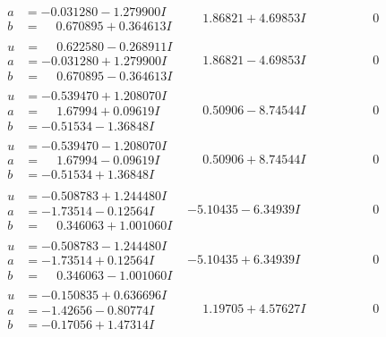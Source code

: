 \documentclass[1p]{elsarticle_modified}
\theoremstyle{definition}
\begin{document}
$$\begin{array}{c|c|c}
\begin{aligned}
a &= -0.031280 - 1.279900 I \\
b &= \phantom{-}0.670895 + 0.364613 I\end{aligned}
 & \phantom{-}1.86821 + 4.69853 I & \phantom{-0.000000 } 0 \\ \hline\begin{aligned}
u &= \phantom{-}0.622580 - 0.268911 I \\
a &= -0.031280 + 1.279900 I \\
b &= \phantom{-}0.670895 - 0.364613 I\end{aligned}
 & \phantom{-}1.86821 - 4.69853 I & \phantom{-0.000000 } 0 \\ \hline\begin{aligned}
u &= -0.539470 + 1.208070 I \\
a &= \phantom{-}1.67994 + 0.09619 I \\
b &= -0.51534 - 1.36848 I\end{aligned}
 & \phantom{-}0.50906 - 8.74544 I & \phantom{-0.000000 } 0 \\ \hline\begin{aligned}
u &= -0.539470 - 1.208070 I \\
a &= \phantom{-}1.67994 - 0.09619 I \\
b &= -0.51534 + 1.36848 I\end{aligned}
 & \phantom{-}0.50906 + 8.74544 I & \phantom{-0.000000 } 0 \\ \hline\begin{aligned}
u &= -0.508783 + 1.244480 I \\
a &= -1.73514 - 0.12564 I \\
b &= \phantom{-}0.346063 + 1.001060 I\end{aligned}
 & -5.10435 - 6.34939 I & \phantom{-0.000000 } 0 \\ \hline\begin{aligned}
u &= -0.508783 - 1.244480 I \\
a &= -1.73514 + 0.12564 I \\
b &= \phantom{-}0.346063 - 1.001060 I\end{aligned}
 & -5.10435 + 6.34939 I & \phantom{-0.000000 } 0 \\ \hline\begin{aligned}
u &= -0.150835 + 0.636696 I \\
a &= -1.42656 - 0.80774 I \\
b &= -0.17056 + 1.47314 I\end{aligned}
 & \phantom{-}1.19705 + 4.57627 I & \phantom{-0.000000 } 0 \\ \hline\begin{aligned}

\end{aligned}
\end{array}$$
\end{document}
